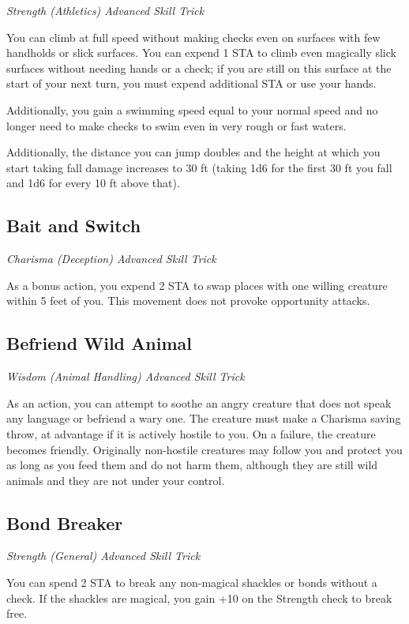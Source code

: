 \textit{Strength (Athletics) Advanced Skill Trick}

You can climb at full speed without making checks even on surfaces with few handholds or slick surfaces. You can expend 1 STA to climb even magically slick surfaces without needing hands or a check; if you are still on this surface at the start of your next turn, you must expend additional STA or use your hands.

Additionally, you gain a swimming speed equal to your normal speed and no longer need to make checks to swim even in very rough or fast waters.

Additionally, the distance you can jump doubles and the height at which you start taking fall damage increases to 30 ft (taking 1d6 for the first 30 ft you fall and 1d6 for every 10 ft above that).

\subsection{Bait and Switch}

\textit{Charisma (Deception) Advanced Skill Trick}

As a bonus action, you expend 2 STA to swap places with one willing creature within 5 feet of you. This movement does not provoke opportunity attacks.

\subsection{Befriend Wild Animal}

\textit{Wisdom (Animal Handling) Advanced Skill Trick}

As an action, you can attempt to soothe an angry creature that does not speak any language or befriend a wary one. The creature must make a Charisma saving throw, at advantage if it is actively hostile to you. On a failure, the creature becomes friendly. Originally non-hostile creatures may follow you and protect you as long as you feed them and do not harm them, although they are still wild animals and they are not under your control.

\subsection{Bond Breaker}

\textit{Strength (General) Advanced Skill Trick}

You can spend 2 STA to break any non-magical shackles or bonds without a check. If the shackles are magical, you gain +10 on the Strength check to break free.

